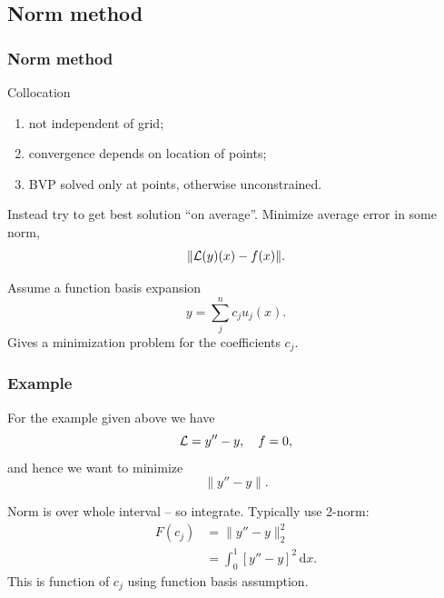 \documentclass{beamer}
\begin{document}
\subsection{Norm method}

\begin{frame}
  \frametitle{Norm method}

  Collocation
  \begin{enumerate}
  \item not independent of grid;
  \item convergence depends on location of points;
  \item BVP solved only at points, otherwise unconstrained.
  \end{enumerate} \pause

  \vspace{1ex}

  Instead try to get best solution ``on average''.  Minimize average
  error in some norm,
  \begin{equation*}
    \| {\cal L} (y) (x) - f(x) \|.
  \end{equation*} \pause

  \vspace{1ex}

  Assume a function basis expansion
  \begin{equation*}
    y = \sum_{j}^n c_j u_j (x).
  \end{equation*}
  Gives a minimization problem for the coefficients $c_j$.

\end{frame}

\begin{frame}
  \frametitle{Example}

  For the example given above we have
  \begin{equation*}
    {\cal L} = y'' - y, \quad f = 0,
  \end{equation*}
  and hence we want to minimize
  \begin{equation*}
    \| y'' - y \|.
  \end{equation*} \pause

  Norm is over whole interval -- so integrate. Typically use 2-norm:
  \begin{align*}
    F(c_j) & = \| y'' - y \|_2^2 \\
    & = \int_0^1 \left[ y'' - y \right]^2 \, \text{d}x.
  \end{align*} \pause
  This is function of $c_j$ using function basis assumption.

\end{frame}
\end{document}
